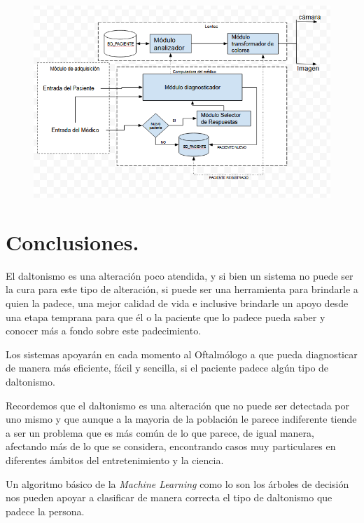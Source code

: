 \documentclass[10pt]{article}
\begin{document}
\begin{figure}[H]
	\begin{center}
\includegraphics[scale = 0.75]{Imagenes/BOSQUEJO.PNG}
	\end{center} 
\end{figure}

\newpage

\section{Conclusiones.}

El daltonismo es una alteración poco atendida, y si bien un sistema no puede ser la cura para este tipo de alteración, si puede ser una herramienta para brindarle a quien la padece, una mejor calidad de vida e inclusive brindarle un apoyo desde una etapa temprana para que él o la paciente que lo padece pueda saber y conocer más a fondo sobre este padecimiento.

Los sistemas apoyarán en cada momento al Oftalmólogo a que pueda diagnosticar de manera más eficiente, fácil y sencilla, si el paciente padece algún tipo de daltonismo.

Recordemos que el daltonismo es una alteración que no puede ser detectada por uno mismo y que aunque a la mayoria de la población le parece indiferente tiende a ser un problema que es más común de lo que parece, de igual manera, afectando más de lo que se considera, encontrando casos muy particulares en diferentes ámbitos del entretenimiento y la ciencia.

Un algoritmo básico de la \textit{Machine Learning} como lo son los árboles de decisión nos pueden apoyar a clasificar de manera correcta el tipo de daltonismo que padece la persona.
\end{document}
